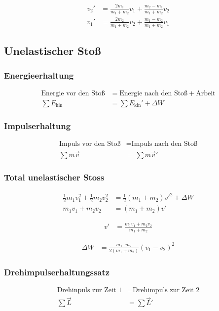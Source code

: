 \begin{align*}
v_2'&=\frac{2m_1}{m_1+m_2}v_1+\frac{m_2-m_1}{m_1+m_2}v_2\\
v_1'&=\frac{2m_2}{m_1+m_2}v_2+\frac{m_1-m_2}{m_1+m_2}v_1
\end{align*}

\newpage
\subsection{Unelastischer Stoß}
\subsubsection*{Energieerhaltung}
\begin{align*}
\text{Energie vor den Stoß} &= \text{Energie nach den Stoß}+\text{Arbeit}\nonumber\\
\sum E_{\text{kin}}&=\sum E_{\text{kin}}'+\Delta W
\end{align*}


\subsubsection*{Impulserhaltung}
\begin{align*}
\text{Impuls vor den Stoß} &= \text{Impuls nach den Stoß}\nonumber\\
\sum m\vec{v}&= \sum m\vec{v}'
\end{align*}


\subsubsection*{Total unelastischer Stoss}
\begin{align*}
\frac{1}{2}m_1v_1^2+\frac{1}{2}m_2v_2^2&=\frac{1}{2}\left(m_1+m_2\right)v'^2+\Delta W\\
m_1v_1+m_2v_2&=\left(m_1+m_2\right)v'
\end{align*}

\begin{align*}
v'&=\frac{m_1v_1+m_2v_2}{m_1+m_2}
\end{align*}

\begin{align*}
\Delta W	&=\frac{m_1\cdot m_2}{2\left(m_1+m_2\right)}\left(v_1-v_2\right)^2
\end{align*}



\subsubsection*{Drehimpulserhaltungssatz}
\begin{align*}
\text{Drehinpuls zur Zeit 1} &= \text{Drehimpuls zur Zeit 2}\\
\sum \vec{L}&=\sum \vec{L}'
\end{align*}


